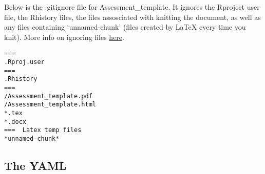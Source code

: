 \documentclass[12pt,]{article}
\begin{document}
Below is the .gitignore file for Assessment\_template. It ignores the
Rproject user file, the Rhistory files, the files assosciated with
knitting the document, as well as any files containing `unnamed-chunk'
(files created by LaTeX every time you knit). More info on ignoring
files \href{http://git-scm.com/docs/gitignore}{here}.

\begin{Verbatim}[frame=single]
===  
.Rproj.user 
===   
.Rhistory  
===   
/Assessment_template.pdf  
/Assessment_template.html  
*.tex  
*.docx  
===  Latex temp files  
*unnamed-chunk*
\end{Verbatim}

\subsection{The YAML}\label{the-yaml}
\end{document}
